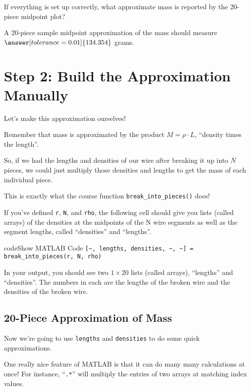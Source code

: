 \documentclass{ximera}
\begin{document}
\begin{problem}
If everything is set up correctly, what approximate mass is reported by the 20-piece midpoint plot? 

A 20-piece sample midpoint approximation of the mass should measure $\answer[tolerance=0.01]{134.354}$ grams.
\end{problem}

\section*{Step 2: Build the Approximation Manually}

Let's make this approximation ourselves!

Remember that mass is approximated by the product $M = \rho \cdot L$, ``density times the length''.

So, if we had the lengths and densities of our wire after breaking it up into $N$ pieces, we could just multiply those densities and lengths to get the mass of each individual piece.

This is exactly what the course function \texttt{break\_into\_pieces()} does!

\begin{remark}
If you've defined \texttt{r}, \texttt{N}, and \texttt{rho}, the following cell should give you lists (called arrays) of the densities at the midpoints of the N wire segments as well as the segment lengths, called ``densities'' and ``lengths''.
\end{remark}

\begin{expandable}{code}{Show MATLAB Code}
\texttt{[\textasciitilde, lengths, densities, \textasciitilde, \textasciitilde] = break\_into\_pieces(r, N, rho)}
\end{expandable}

In your output, you should see two $1\times20$ lists (called arrays), ``lengths'' and ``densities''. The numbers in each are the lengths of the broken wire and the densities of the broken wire.

\subsection*{20-Piece Approximation of Mass}

Now we're going to use \texttt{lengths} and \texttt{densities} to do some quick approximations.

One really nice feature of MATLAB is that it can do many many calculations at once! For instance, ``\texttt{.*}'' will multiply the entries of two arrays at matching index values.
\end{document}
